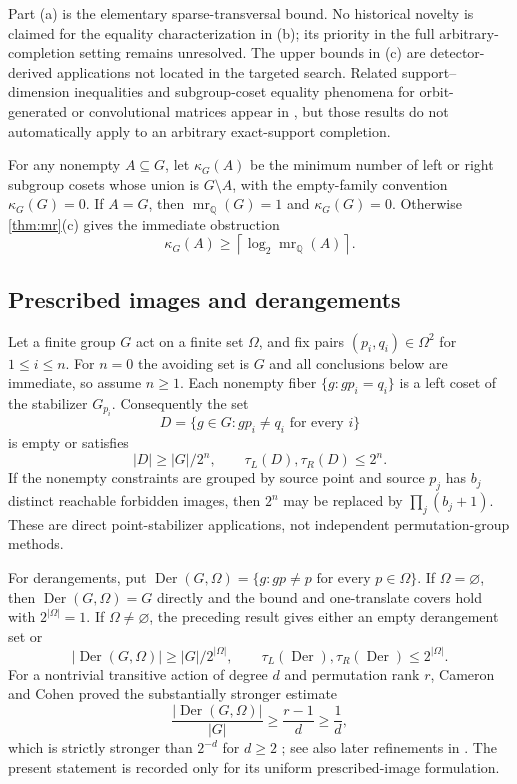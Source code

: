 \documentclass[11pt,a4paper]{amsart}
\theoremstyle{definition}
\theoremstyle{remark}
\newcommand{\mr}{\operatorname{mr}}
\newcommand{\Der}{\operatorname{Der}}
\newcommand{\Q}{\mathbb{Q}}
\begin{document}
Part (a) is the elementary sparse-transversal bound.  No historical novelty is
claimed for the equality characterization in (b); its priority in the full
arbitrary-completion setting remains unresolved.  The upper bounds in (c) are
detector-derived applications not located in the targeted search.  Related
support--dimension inequalities and subgroup-coset equality phenomena for
orbit-generated or convolutional matrices appear in
\cite{GoldsteinGuralnickIsaacs2005,BorelloWillemsZini2022,ChenFanLuo2025}, but
those results do not automatically apply to an arbitrary exact-support
completion.

For any nonempty $A\subseteq G$, let $\kappa_G(A)$ be the minimum number of
left or right subgroup cosets whose union is $G\setminus A$, with the
empty-family convention $\kappa_G(G)=0$.  If $A=G$, then
$\mr_{\Q}(G)=1$ and $\kappa_G(G)=0$.  Otherwise
\cref{thm:mr}(c) gives the immediate obstruction
\[
  \kappa_G(A)\ge\left\lceil\log_2\mr_{\Q}(A)\right\rceil.
\]

\subsection{Prescribed images and derangements}
Let a finite group $G$ act on a finite set $\Omega$, and fix pairs
$(p_i,q_i)\in\Omega^2$ for $1\le i\le n$.  For $n=0$ the avoiding set is
$G$ and all conclusions below are immediate, so assume $n\ge1$.  Each nonempty fiber
$\{g:gp_i=q_i\}$ is a left coset of the stabilizer $G_{p_i}$.
Consequently the set
\[
  D=\{g\in G:gp_i\ne q_i\text{ for every }i\}
\]
is empty or satisfies
\[
  |D|\ge |G|/2^n,\qquad \tau_L(D),\tau_R(D)\le2^n.
\]
If the nonempty constraints are grouped by source point and source $p_j$ has
$b_j$ distinct reachable forbidden images, then $2^n$ may be replaced by
$\prod_j(b_j+1)$.  These are direct point-stabilizer applications, not
independent permutation-group methods.

For derangements, put
$\Der(G,\Omega)=\{g:gp\ne p\text{ for every }p\in\Omega\}$.  If
$\Omega=\varnothing$, then $\Der(G,\Omega)=G$ directly and the bound and
one-translate covers hold with $2^{|\Omega|}=1$.  If $\Omega\ne\varnothing$,
the preceding result gives either an empty derangement set or
\[
  |\Der(G,\Omega)|\ge |G|/2^{|\Omega|},\qquad
  \tau_L(\Der),\tau_R(\Der)\le2^{|\Omega|}.
\]
For a nontrivial transitive action of degree $d$ and permutation rank $r$,
Cameron and Cohen proved the substantially stronger estimate
\[
  \frac{|\Der(G,\Omega)|}{|G|}\ge\frac{r-1}{d}\ge\frac1d,
\]
which is strictly stronger than $2^{-d}$ for $d\ge2$
\cite[p.~136]{CameronCohen1992}; see also later refinements in
\cite{BarbieriSpiga2024}.  The present statement is recorded only for
its uniform prescribed-image formulation.
\end{document}
